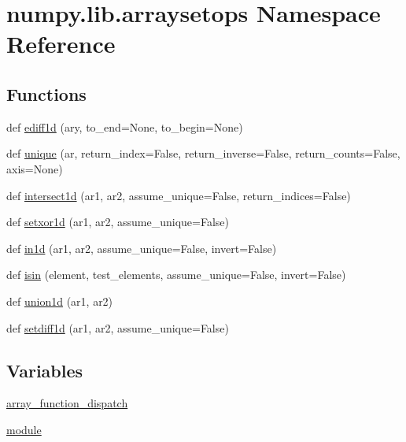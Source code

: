 \hypertarget{namespacenumpy_1_1lib_1_1arraysetops}{}\section{numpy.\+lib.\+arraysetops Namespace Reference}
\label{namespacenumpy_1_1lib_1_1arraysetops}
\subsection*{Functions}
\begin{DoxyCompactItemize}
\item 
def \hyperlink{namespacenumpy_1_1lib_1_1arraysetops_ad44482da19257c39a92f4f75472bd9cc}{ediff1d} (ary, to\+\_\+end=None, to\+\_\+begin=None)
\item 
def \hyperlink{namespacenumpy_1_1lib_1_1arraysetops_aa904c718a035bed3e6f4ae029c70f509}{unique} (ar, return\+\_\+index=False, return\+\_\+inverse=False, return\+\_\+counts=False, axis=None)
\item 
def \hyperlink{namespacenumpy_1_1lib_1_1arraysetops_a9231040ecb3b9a1be9f2c7f4ab965eff}{intersect1d} (ar1, ar2, assume\+\_\+unique=False, return\+\_\+indices=False)
\item 
def \hyperlink{namespacenumpy_1_1lib_1_1arraysetops_af8cf3b832fa490980a67a412e39005b6}{setxor1d} (ar1, ar2, assume\+\_\+unique=False)
\item 
def \hyperlink{namespacenumpy_1_1lib_1_1arraysetops_a23feca2c05fb2ccf7d9e1d0db8b1f079}{in1d} (ar1, ar2, assume\+\_\+unique=False, invert=False)
\item 
def \hyperlink{namespacenumpy_1_1lib_1_1arraysetops_af393d30e45d93ce9da6c4ebbe47541ee}{isin} (element, test\+\_\+elements, assume\+\_\+unique=False, invert=False)
\item 
def \hyperlink{namespacenumpy_1_1lib_1_1arraysetops_aee4dfa0812942b38eb9cbd7da426d3b4}{union1d} (ar1, ar2)
\item 
def \hyperlink{namespacenumpy_1_1lib_1_1arraysetops_ad861ef8ca9321e4a02d8e0ba4d1d9cae}{setdiff1d} (ar1, ar2, assume\+\_\+unique=False)
\end{DoxyCompactItemize}
\subsection*{Variables}
\begin{DoxyCompactItemize}
\item 
\hyperlink{namespacenumpy_1_1lib_1_1arraysetops_ad2ed5d82dfe2e7bee05263ba295c5d8a}{array\+\_\+function\+\_\+dispatch}
\item 
\hyperlink{namespacenumpy_1_1lib_1_1arraysetops_a6785e47460cf208e014c7d75970a386d}{module}
\end{DoxyCompactItemize}


